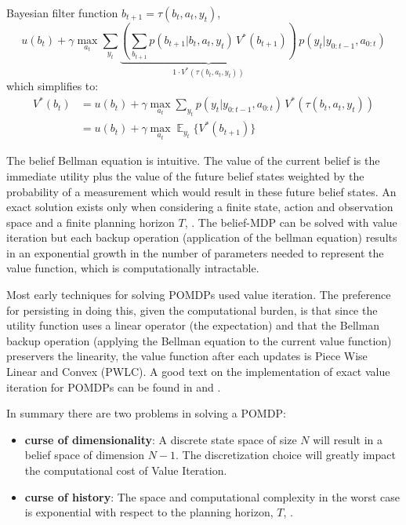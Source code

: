 Bayesian filter function $b_{t+1} = \tau(b_t,a_t,y_t)$,
\begin{equation}\label{eq:max_component}
u(b_t) + \gamma \max_{a_t} \sum_{y_t} \underbrace{\left( \sum_{b_{t+1}} p(b_{t+1}|b_t,a_t,y_t)\,V^*(b_{t+1})\right)}_{1 \cdot V^*(\tau(b_t,a_t,y_t))}\, p(y_t|y_{0:t-1},a_{0:t})
\end{equation}
which simplifies to:
\begin{align}\label{eq:final_belief_bellman}
  V^*(b_t) &= u(b_t) + \gamma \max_{a_t} \sum_{y_t}  p(y_t|y_{0:t-1},a_{0:t}) \,V^*(\tau(b_t,a_t,y_t))\nonumber  \\ 
	   &= u(b_t) + \gamma \max_{a_t} \displaystyle \mathop{\mathbb{E}}_{y_t}\{V^*(b_{t+1})\}
\end{align}

The belief Bellman equation is intuitive. The value of the current belief is the immediate utility plus the value of the 
future belief states weighted by the probability of a measurement which would result in these future belief states. 
An exact solution exists only when considering a finite state, action and observation space and a finite planning horizon $T$, \cite{Sondik_1973}.
The belief-MDP can be solved with value iteration but each backup operation (application of the bellman equation) 
results in an exponential growth in the number of parameters needed to represent the value function, which 
is computationally intractable.

Most early techniques for solving POMDPs used value iteration. The preference for persisting in doing this, given the computational
burden, is that since the utility function uses a linear operator (the expectation) and that the Bellman backup operation 
(applying the Bellman equation to the current value function) preservers the linearity, the value function after each 
updates is Piece Wise Linear and Convex (PWLC). A good text on the implementation of exact value iteration for POMDPs can be 
found in \cite[Chap. 15]{Thrun_2005} and \cite{Kaelbling_1998}.

In summary there are two problems in solving a POMDP:
\begin{itemize}
 \item \textbf{curse of dimensionality}: A discrete state space of size $N$ will result in a belief space of dimension $N-1$. The discretization
 choice will greatly impact the computational cost of Value Iteration.
 \item \textbf{curse of history}: The space and computational complexity in the worst case is exponential with respect to the planning 
 horizon, $T$, \cite{POMDP_approach_2010}.
\end{itemize}

